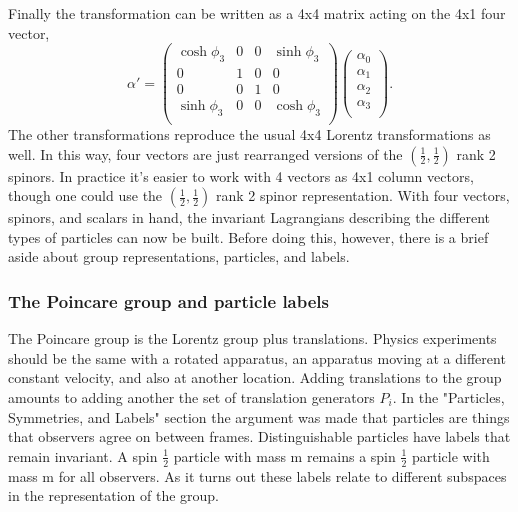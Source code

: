 Finally the transformation can be written as a 4x4 matrix acting on the 4x1 four vector,
\begin{equation}
\alpha' = 
\begin{pmatrix}
\cosh\phi_3 & 0 & 0 & \sinh\phi_3 \\
0 & 1 & 0 & 0 \\
0 & 0 & 1 & 0 \\
\sinh\phi_3 & 0 & 0 & \cosh\phi_3 \\
\end{pmatrix}
\begin{pmatrix}
\alpha_0 \\
\alpha_1 \\
\alpha_2 \\
\alpha_3 \\
\end{pmatrix}.
\end{equation}
The other transformations reproduce the usual 4x4 Lorentz transformations as well. In this way, four vectors are just rearranged versions of the $(\frac{1}{2}, \frac{1}{2})$ rank 2 spinors. In practice it's easier to work with 4 vectors as 4x1 column vectors, though one could use the $(\frac{1}{2}, \frac{1}{2})$ rank 2 spinor representation. With four vectors, spinors, and scalars in hand, the invariant Lagrangians describing the different types of particles can now be built. Before doing this, however, there is a brief aside about group representations, particles, and labels.

\subsubsection{The Poincare group and particle labels}

The Poincare group is the Lorentz group plus translations. Physics experiments should be the same with a rotated apparatus, an apparatus moving at a different constant velocity, and also at another location. Adding translations to the group amounts to adding another the set of translation generators $P_i$. In the "Particles, Symmetries, and Labels" section the argument was made that particles are things that observers agree on between frames. Distinguishable particles have labels that remain invariant. A spin $\frac{1}{2}$ particle with mass m remains a spin $\frac{1}{2}$ particle with mass m for all observers. As it turns out these labels relate to different subspaces in the representation of the group.

